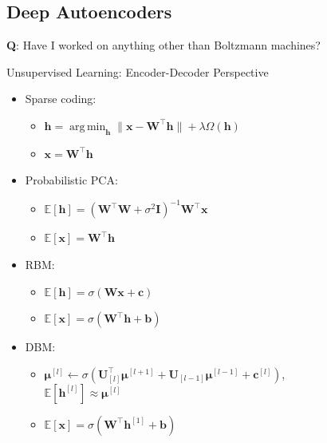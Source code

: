 \documentclass{beamer}
\newcommand{\qlay}[1]{\left[#1\right]}
\newcommand{\vect}[1]{\mathbf{#1}}
\newcommand{\vects}[1]{\boldsymbol{#1}}
\newcommand{\matr}[1]{\mathbf{#1}}
\newcommand{\vb}[0]{\vect{b}}
\newcommand{\vc}[0]{\vect{c}}
\newcommand{\vh}[0]{\vect{h}}
\newcommand{\vx}[0]{\vect{x}}
\newcommand{\mW}[0]{\matr{W}}
\newcommand{\mU}[0]{\matr{U}}
\newcommand{\mI}{\matr{I}}
\newcommand{\vmu}[0]{\vects{\mu}}
\newcommand{\E}[0]{\mathbb{E}}
\DeclareMathOperator*{\argmin}{arg\,min}
\begin{document}
\subsection{Deep Autoencoders}

\begin{frame}
\centering
{\bf Q}: Have I worked on anything other than Boltzmann machines?
\end{frame}

\begin{frame}{Unsupervised Learning: Encoder-Decoder Perspective}

\begin{minipage}{0.67\textwidth}
\begin{itemize}
\item Sparse coding:
\begin{itemize}
\item[Encoder] $\vh = \argmin_{\vh} \| \vx - \mW^\top \vh \| + \lambda \Omega(\vh)$
\item[Decoder] $\vx = \mW^\top \vh$
\end{itemize}
\item Probabilistic PCA:
\begin{itemize}
\item[Encoder] $
    \E \left[ \vh \right] = (\mW^\top
    \mW + \sigma^2
    \mI)^{-1} \mW^\top \vx$
\item[Decoder] $\E \left[ \vx\right] = \mW^\top \vh$
\end{itemize}
\item RBM:
\begin{itemize}
\item[Encoder] $\E\left[\vh\right] = \sigma(\mW \vx + \vc)$
\item[Decoder] $\E\left[\vx\right] = \sigma(\mW^\top \vh + \vb)$
\end{itemize}
\item DBM:
\begin{itemize}
\item[Encoder] $\vmu^{\qlay{l}} \leftarrow \sigma(\mU_{\qlay{l}}^\top \vmu^{\qlay{l+1}} + 
        \mU_{\qlay{l-1}} \vmu^{\qlay{l-1}}+ \vc^{\qlay{l}})$, \\
        $\E\left[\vh^{\qlay{l}}\right] \approx \vmu^{\qlay{l}}$
\item[Decoder] $\E\left[\vx\right] = \sigma(\mW^\top \vh^{\qlay{1}} + \vb)$
\end{itemize}
\end{itemize}
\end{minipage}
\begin{minipage}{0.32\textwidth}

\end{minipage}
\end{frame}
\end{document}
